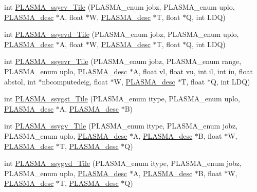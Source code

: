 \begin{DoxyCompactItemize}
int \hyperlink{group__float__Tile_ga4cea879175261b653369407d34b2d358_ga4cea879175261b653369407d34b2d358}{P\+L\+A\+S\+M\+A\+\_\+ssyev\+\_\+\+Tile} (P\+L\+A\+S\+M\+A\+\_\+enum jobz, P\+L\+A\+S\+M\+A\+\_\+enum uplo, \hyperlink{structplasma__desc__t}{P\+L\+A\+S\+M\+A\+\_\+desc} $\ast$A, float $\ast$W, \hyperlink{structplasma__desc__t}{P\+L\+A\+S\+M\+A\+\_\+desc} $\ast$T, float $\ast$Q, int L\+D\+Q)
\item 
int \hyperlink{group__float__Tile_ga2fc7699488f0b8d17c875b7864577ef8_ga2fc7699488f0b8d17c875b7864577ef8}{P\+L\+A\+S\+M\+A\+\_\+ssyevd\+\_\+\+Tile} (P\+L\+A\+S\+M\+A\+\_\+enum jobz, P\+L\+A\+S\+M\+A\+\_\+enum uplo, \hyperlink{structplasma__desc__t}{P\+L\+A\+S\+M\+A\+\_\+desc} $\ast$A, float $\ast$W, \hyperlink{structplasma__desc__t}{P\+L\+A\+S\+M\+A\+\_\+desc} $\ast$T, float $\ast$Q, int L\+D\+Q)
\item 
int \hyperlink{group__float__Tile_ga0515679d76f496ab88d79c3904e8b2f4_ga0515679d76f496ab88d79c3904e8b2f4}{P\+L\+A\+S\+M\+A\+\_\+ssyevr\+\_\+\+Tile} (P\+L\+A\+S\+M\+A\+\_\+enum jobz, P\+L\+A\+S\+M\+A\+\_\+enum range, P\+L\+A\+S\+M\+A\+\_\+enum uplo, \hyperlink{structplasma__desc__t}{P\+L\+A\+S\+M\+A\+\_\+desc} $\ast$A, float vl, float vu, int il, int iu, float abstol, int $\ast$nbcomputedeig, float $\ast$W, \hyperlink{structplasma__desc__t}{P\+L\+A\+S\+M\+A\+\_\+desc} $\ast$T, float $\ast$Q, int L\+D\+Q)
\item 
int \hyperlink{group__float__Tile_ga47edc276e115a0eb253b2a4bda9a3b9e_ga47edc276e115a0eb253b2a4bda9a3b9e}{P\+L\+A\+S\+M\+A\+\_\+ssygst\+\_\+\+Tile} (P\+L\+A\+S\+M\+A\+\_\+enum itype, P\+L\+A\+S\+M\+A\+\_\+enum uplo, \hyperlink{structplasma__desc__t}{P\+L\+A\+S\+M\+A\+\_\+desc} $\ast$A, \hyperlink{structplasma__desc__t}{P\+L\+A\+S\+M\+A\+\_\+desc} $\ast$B)
\item 
int \hyperlink{group__float__Tile_gaf4fce913d91be59999ba6a842ec1ad8d_gaf4fce913d91be59999ba6a842ec1ad8d}{P\+L\+A\+S\+M\+A\+\_\+ssygv\+\_\+\+Tile} (P\+L\+A\+S\+M\+A\+\_\+enum itype, P\+L\+A\+S\+M\+A\+\_\+enum jobz, P\+L\+A\+S\+M\+A\+\_\+enum uplo, \hyperlink{structplasma__desc__t}{P\+L\+A\+S\+M\+A\+\_\+desc} $\ast$A, \hyperlink{structplasma__desc__t}{P\+L\+A\+S\+M\+A\+\_\+desc} $\ast$B, float $\ast$W, \hyperlink{structplasma__desc__t}{P\+L\+A\+S\+M\+A\+\_\+desc} $\ast$T, \hyperlink{structplasma__desc__t}{P\+L\+A\+S\+M\+A\+\_\+desc} $\ast$Q)
\item 
int \hyperlink{group__float__Tile_gaabdc43dc2d083a9b795bd359ebdb1a69_gaabdc43dc2d083a9b795bd359ebdb1a69}{P\+L\+A\+S\+M\+A\+\_\+ssygvd\+\_\+\+Tile} (P\+L\+A\+S\+M\+A\+\_\+enum itype, P\+L\+A\+S\+M\+A\+\_\+enum jobz, P\+L\+A\+S\+M\+A\+\_\+enum uplo, \hyperlink{structplasma__desc__t}{P\+L\+A\+S\+M\+A\+\_\+desc} $\ast$A, \hyperlink{structplasma__desc__t}{P\+L\+A\+S\+M\+A\+\_\+desc} $\ast$B, float $\ast$W, \hyperlink{structplasma__desc__t}{P\+L\+A\+S\+M\+A\+\_\+desc} $\ast$T, \hyperlink{structplasma__desc__t}{P\+L\+A\+S\+M\+A\+\_\+desc} $\ast$Q)

\end{DoxyCompactItemize}
